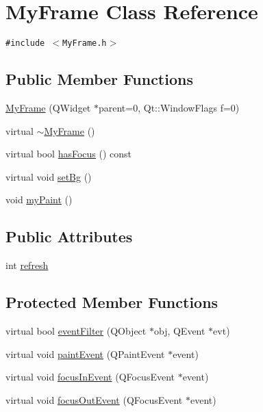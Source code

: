 \hypertarget{class_my_frame}{
\section{MyFrame Class Reference}
\label{class_my_frame}
}
{\tt \#include $<$MyFrame.h$>$}

\subsection*{Public Member Functions}
\begin{CompactItemize}
\item 
\hyperlink{class_my_frame_79627212ce6e4b52f4a33e623d1a4ffd}{MyFrame} (QWidget $\ast$parent=0, Qt::WindowFlags f=0)
\item 
virtual \hyperlink{class_my_frame_711b2bda77494841f2e582982b80c356}{$\sim$MyFrame} ()
\item 
virtual bool \hyperlink{class_my_frame_57b97439f113ac89c53e6e036238e686}{hasFocus} () const 
\item 
virtual void \hyperlink{class_my_frame_90c2f37cdefddf0f871a31a5ea17f0f8}{setBg} ()
\item 
void \hyperlink{class_my_frame_45169ce8a61142d2231da2b5551c63f1}{myPaint} ()
\end{CompactItemize}
\subsection*{Public Attributes}
\begin{CompactItemize}
\item 
int \hyperlink{class_my_frame_a8071d89f7cafe590b2ea64a99e97d02}{refresh}
\end{CompactItemize}
\subsection*{Protected Member Functions}
\begin{CompactItemize}
\item 
virtual bool \hyperlink{class_my_frame_32e63ef366e315e0bafb66a5a14c3157}{eventFilter} (QObject $\ast$obj, QEvent $\ast$evt)
\item 
virtual void \hyperlink{class_my_frame_bce78e90918adc3c95cc39b28ff8c2f6}{paintEvent} (QPaintEvent $\ast$event)
\item 
virtual void \hyperlink{class_my_frame_ee2d52f24c497e8183b08b199690a2ec}{focusInEvent} (QFocusEvent $\ast$event)
\item 
virtual void \hyperlink{class_my_frame_64a3e5779e8a62f963de11ce75e5480f}{focusOutEvent} (QFocusEvent $\ast$event)
\end{CompactItemize}
